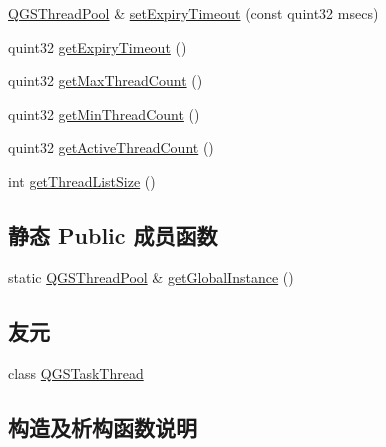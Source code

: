 \begin{DoxyCompactItemize}
\item 
\mbox{\hyperlink{class_q_g_s_thread_pool}{Q\+G\+S\+Thread\+Pool}} \& \mbox{\hyperlink{class_q_g_s_thread_pool_afc4ae98d161f984d5f14f71ff278554e}{set\+Expiry\+Timeout}} (const quint32 msecs)
\item 
quint32 \mbox{\hyperlink{class_q_g_s_thread_pool_a677b3c3d018b1967395236c7596fb547}{get\+Expiry\+Timeout}} ()
\item 
quint32 \mbox{\hyperlink{class_q_g_s_thread_pool_a259f68bcb6e4ae93130dbe2c290203af}{get\+Max\+Thread\+Count}} ()
\item 
quint32 \mbox{\hyperlink{class_q_g_s_thread_pool_a68b150011ba298c5b776375f6cf171ff}{get\+Min\+Thread\+Count}} ()
\item 
quint32 \mbox{\hyperlink{class_q_g_s_thread_pool_a34ac59626f455914c55b46275de043b7}{get\+Active\+Thread\+Count}} ()
\item 
int \mbox{\hyperlink{class_q_g_s_thread_pool_a5e1057a4fc10abceea8e75de01ce8683}{get\+Thread\+List\+Size}} ()
\end{DoxyCompactItemize}
\subsection*{静态 Public 成员函数}
\begin{DoxyCompactItemize}
\item 
static \mbox{\hyperlink{class_q_g_s_thread_pool}{Q\+G\+S\+Thread\+Pool}} \& \mbox{\hyperlink{class_q_g_s_thread_pool_ae53cca42797192148ca02d0628037744}{get\+Global\+Instance}} ()
\end{DoxyCompactItemize}
\subsection*{友元}
\begin{DoxyCompactItemize}
\item 
class \mbox{\hyperlink{class_q_g_s_thread_pool_aecc60efeed05d1eec7e38fa804a1a80e}{Q\+G\+S\+Task\+Thread}}
\end{DoxyCompactItemize}


\subsection{构造及析构函数说明}
\mbox{\label{class_q_g_s_thread_pool_aee3b59cc02b7cab4c28e1dda0cd30199}} 
